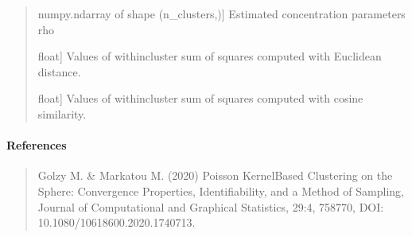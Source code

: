 \documentclass[letterpaper,10pt,english,openany,oneside]{sphinxmanual}
\begin{document}
\begin{fulllineitems}
\begin{quote}
\begin{description}
\sphinxlineitem{rho\_}{[}numpy.ndarray of shape (n\_clusters,){]}
\sphinxAtStartPar
Estimated concentration parameters rho

\sphinxlineitem{euclidean\_wcss\_}{[}float{]}
\sphinxAtStartPar
Values of within\sphinxhyphen{}cluster sum of squares computed with 
Euclidean distance.

\sphinxlineitem{cosine\_wcss\_}{[}float{]}
\sphinxAtStartPar
Values of within\sphinxhyphen{}cluster sum of squares computed with 
cosine similarity.

\end{description}
\end{quote}


\paragraph{References}
\label{\detokenize{api_reference/generated/QuadratiK.spherical_clustering.PKBC:references}}\begin{quote}

\sphinxAtStartPar
Golzy M. \& Markatou M. (2020) Poisson Kernel\sphinxhyphen{}Based 
Clustering on the Sphere: Convergence Properties, Identifiability, 
and a Method of Sampling, Journal of Computational and Graphical Statistics, 
29:4, 758\sphinxhyphen{}770, DOI: 10.1080/10618600.2020.1740713.
\end{quote}



\end{fulllineitems}
\end{document}
